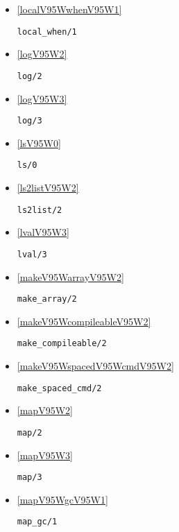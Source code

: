 \begin{itemize}
\item \ref{localV95WwhenV95W1} 
\begin{verbatim}
local_when/1
\end{verbatim}

\item \ref{logV95W2} 
\begin{verbatim}
log/2
\end{verbatim}

\item \ref{logV95W3} 
\begin{verbatim}
log/3
\end{verbatim}

\item \ref{lsV95W0} 
\begin{verbatim}
ls/0
\end{verbatim}

\item \ref{ls2listV95W2} 
\begin{verbatim}
ls2list/2
\end{verbatim}

\item \ref{lvalV95W3} 
\begin{verbatim}
lval/3
\end{verbatim}

\item \ref{makeV95WarrayV95W2} 
\begin{verbatim}
make_array/2
\end{verbatim}

\item \ref{makeV95WcompileableV95W2} 
\begin{verbatim}
make_compileable/2
\end{verbatim}

\item \ref{makeV95WspacedV95WcmdV95W2} 
\begin{verbatim}
make_spaced_cmd/2
\end{verbatim}

\item \ref{mapV95W2} 
\begin{verbatim}
map/2
\end{verbatim}

\item \ref{mapV95W3} 
\begin{verbatim}
map/3
\end{verbatim}

\item \ref{mapV95WgcV95W1} 
\begin{verbatim}
map_gc/1
\end{verbatim}


\end{itemize}
